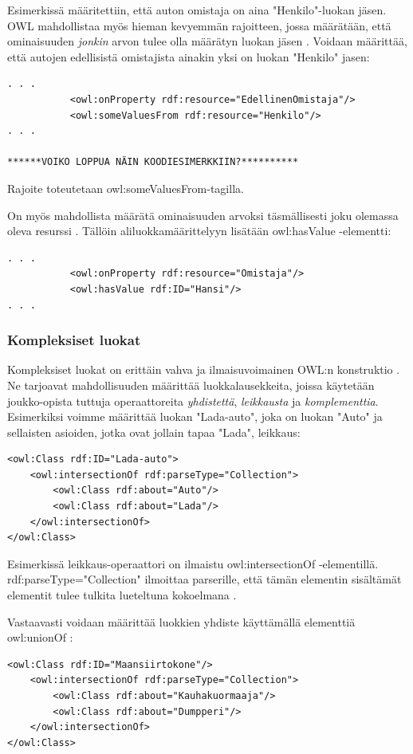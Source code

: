 \documentclass[finnish]{tktltiki2}
\theoremstyle{definition}
\theoremstyle{remark}
\begin{document}
Esimerkissä määritettiin, että auton omistaja on aina "Henkilo"-luokan jäsen. OWL mahdollistaa myös hieman kevyemmän rajoitteen, jossa määrätään, että ominaisuuden \textit{jonkin} arvon tulee olla määrätyn luokan jäsen \cite{SWM04}. Voidaan määrittää, että autojen edellisistä omistajista ainakin yksi on luokan "Henkilo" jasen:
\begin{verbatim}
. . .
           <owl:onProperty rdf:resource="EdellinenOmistaja"/>
           <owl:someValuesFrom rdf:resource="Henkilo"/>
. . .

******VOIKO LOPPUA NÄIN KOODIESIMERKKIIN?**********
\end{verbatim}
Rajoite toteutetaan owl:someValuesFrom-tagilla.

On myös mahdollista määrätä ominaisuuden arvoksi täsmällisesti joku olemassa oleva resurssi \cite{SWM04}. Tällöin aliluokkamäärittelyyn lisätään owl:hasValue -elementti:
\begin{verbatim}
. . .
           <owl:onProperty rdf:resource="Omistaja"/>
           <owl:hasValue rdf:ID="Hansi"/>
. . .
\end{verbatim}

\subsubsection{Kompleksiset luokat}
Kompleksiset luokat on erittäin vahva ja ilmaisuvoimainen OWL:n konstruktio \cite{SWM04}. Ne tarjoavat mahdollisuuden määrittää luokkalausekkeita, joissa käytetään joukko-opista tuttuja operaattoreita \textit{yhdistettä}, \textit{leikkausta} ja \textit{komplementtia}. Esimerkiksi voimme määrittää luokan "Lada-auto", joka on luokan "Auto" ja sellaisten asioiden, jotka ovat jollain tapaa "Lada", leikkaus:
\begin{verbatim}
<owl:Class rdf:ID="Lada-auto">
    <owl:intersectionOf rdf:parseType="Collection">
        <owl:Class rdf:about="Auto"/>
        <owl:Class rdf:about="Lada"/>
    </owl:intersectionOf>
</owl:Class>
\end{verbatim}

Esimerkissä leikkaus-operaattori on ilmaistu owl:intersectionOf -elementillä. rdf:parseType="Collection" ilmoittaa parserille, että tämän elementin sisältämät elementit tulee tulkita lueteltuna kokoelmana \cite{SWM04}.

Vastaavasti voidaan määrittää luokkien yhdiste käyttämällä elementtiä owl:unionOf \cite{SWM04}:
\begin{verbatim}
<owl:Class rdf:ID="Maansiirtokone"/>
    <owl:intersectionOf rdf:parseType="Collection">
        <owl:Class rdf:about="Kauhakuormaaja"/>
        <owl:Class rdf:about="Dumpperi"/>
    </owl:intersectionOf>
</owl:Class>
\end{verbatim}
 
\end{document}
